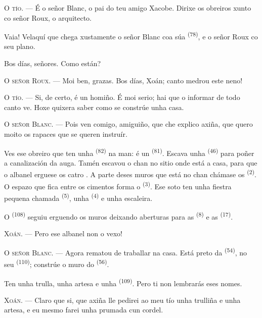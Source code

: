 \textsc{O tío}. --- É o señor Blanc, o pai do teu amigo Xacobe. Dirixe os obreiros
xunto co señor Roux, o arquitecto.

Vaia! Velaquí que chega xustamente o señor Blanc coa súa 
\textsuperscript{(78)}, e o señor Roux co seu plano.

Bos días, señores. Como están?

\textsc{O señor Roux}. --- Moi ben, grazas. Bos días, Xoán; canto medrou este neno!

\textsc{O tío}. --- Si, de certo, é un homiño. É moi serio; hai que o informar de
todo canto ve. Hoxe quixera saber como se constrúe unha casa.

\VUsaut{3.0mm}

\textsc{O señor Blanc}. --- Pois ven comigo, amiguiño, que che explico axiña, que
quero moito os rapaces que se queren instruír.

Ves ese obreiro que ten unha  \textsuperscript{(82)} na man: é un
 \textsuperscript{(81)}. Escava unha 
\textsuperscript{(46)} para poñer a canalización da auga. Tamén escavou o chan no
sitio onde está a casa, para que o albanel erguese os catro . A parte
deses muros que está no chan chámase os  \textsuperscript{(2)}. O
espazo que fica entre os cimentos forma o  \textsuperscript{(3)}. Ese
soto ten unha fiestra pequena chamada  \textsuperscript{(5)}, unha
 \textsuperscript{(4)} e unha escaleira.

O  \textsuperscript{(108)} seguiu erguendo os muros deixando aberturas
para as  \textsuperscript{(8)} e as 
\textsuperscript{(17)}.

\textsc{Xoán}. --- Pero ese albanel non o vexo!

\textsc{O señor Blanc}. --- Agora rematou de traballar na casa. Está preto da
 \textsuperscript{(54)}, no seu 
\textsuperscript{(110)}; constrúe o muro do 
\textsuperscript{(56)}.

Ten unha trulla, unha artesa e unha  \textsuperscript{(109)}. Pero ti
non lembrarás eses nomes.

\textsc{Xoán}. --- Claro que si, que axiña lle pedirei ao meu tío unha trulliña e
unha artesa, e eu mesmo farei unha prumada cun cordel.

